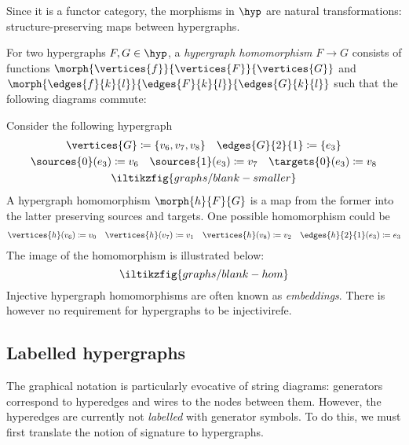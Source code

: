 Since it is a functor category, the morphisms in \(\hyp\) are natural
transformations: structure-preserving maps between hypergraphs.

\begin{definition}\label{def:hypergraph-homomorphism}
    For two hypergraphs \(F, G \in \hyp\), a \emph{hypergraph homomorphism}
    \(F \to G\) consists of functions
    \(\morph{\vertices{f}}{\vertices{F}}{\vertices{G}}\) and
    \(\morph{\edges{f}{k}{l}}{\edges{F}{k}{l}}{\edges{G}{k}{l}}\) such that the
    following diagrams commute:
    
\end{definition}

\begin{example}\label{ex:hypergraph-homomorphism}
    Consider the following hypergraph
    \begin{gather*}
        \vertices{G} \coloneqq \{v_6,v_7,v_8\}
        \quad
        \edges{G}{2}{1} \coloneqq \{e_3\}
        \\
        \sources{0}(e_3) \coloneqq v_6
        \quad
        \sources{1}(e_3) \coloneqq v_7
        \quad
        \targets{0}(e_3) \coloneqq v_8
        \\
        \iltikzfig{graphs/blank-smaller}
    \end{gather*}
    A hypergraph homomorphism \(\morph{h}{F}{G}\) is a map from the former into
    the latter preserving sources and targets.
    One possible homomorphism could be
    \begin{gather*}
        \vertices{h}(v_6) \coloneqq v_0
        \quad
        \vertices{h}(v_7) \coloneqq v_1
        \quad
        \vertices{h}(v_8) \coloneqq v_2
        \quad
        \edges{h}{2}{1}(e_3) \coloneqq e_3
    \end{gather*}
    The image of the homomorphism is illustrated below:
    \[
        \iltikzfig{graphs/blank-hom}
    \]
    Injective hypergraph homomorphisms are often known as \emph{embeddings}.
    There is however no requirement for hypergraphs to be injectivirefe.
\end{example}

\subsection{Labelled hypergraphs}

The graphical notation is particularly evocative of string diagrams: generators
correspond to hyperedges and wires to the nodes between them.
However, the hyperedges are currently not \emph{labelled} with generator
symbols.
To do this, we must first translate the notion of signature to hypergraphs.

